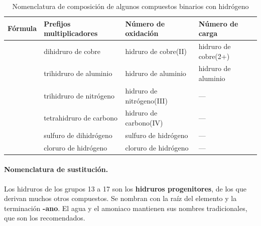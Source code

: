 \begin{table}[H]
    \centering
    \caption{Nomenclatura de composición de algunos compuestos binarios con hidrógeno}
    \vspace{-5pt}
    \begin{tabular}{@{}lL{3.6cm}L{3.6cm}L{3.6cm}@{}}
        \toprule
        \textbf{Fórmula} & \textbf{Prefijos multiplicadores} & \textbf{Número de oxidación} & \textbf{Número de carga} \\
        \midrule
         & dihidruro de cobre & hidruro de cobre(II) & hidruro de cobre(2+) \\[3pt]
         & trihidruro de aluminio & hidruro de aluminio & hidruro de aluminio \\[3pt]
         & trihidruro de nitrógeno & hidruro de nitrógeno(III) & --- \\[3pt]
         & tetrahidruro de carbono & hidruro de carbono(IV) & --- \\[3pt]
         & sulfuro de dihidrógeno & sulfuro de hidrógeno & --- \\[3pt]
         & cloruro de hidrógeno & cloruro de hidrógeno & --- \\
        \bottomrule
    \end{tabular}
    \label{tab:ud5-hidruros}
\end{table}

\paragraph{Nomenclatura de sustitución.} Los hidruros de los grupos 13 a 17 son los \textbf{hidruros progenitores}, de los que
derivan muchos otros compuestos. Se nombran con la raíz del elemento y la terminación \textbf{-ano}. El agua y el amoniaco
mantienen sus nombres tradicionales, que son los recomendados.

